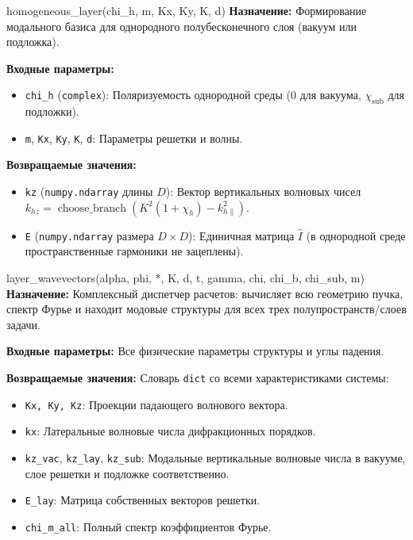 \documentclass[a4paper,11pt]{article}
\begin{document}
\begin{funcbox}{homogeneous\_layer(chi\_h, m, Kx, Ky, K, d)}
\textbf{Назначение:} Формирование модального базиса для однородного полубесконечного слоя (вакуум или подложка).

\textbf{Входные параметры:}
\begin{itemize}
    \item \texttt{chi\_h} (\texttt{complex}): Поляризуемость однородной среды ($0$ для вакуума, $\chi_{\text{sub}}$ для подложки).
    \item \texttt{m}, \texttt{Kx}, \texttt{Ky}, \texttt{K}, \texttt{d}: Параметры решетки и волны.
\end{itemize}

\textbf{Возвращаемые значения:}
\begin{itemize}
    \item \texttt{kz} (\texttt{numpy.ndarray} длины $D$): Вектор вертикальных волновых чисел $k_{hz} = \operatorname{choose\_branch}(K^2(1 + \chi_h) - k_{h\parallel}^2)$.
    \item \texttt{E} (\texttt{numpy.ndarray} размера $D \times D$): Единичная матрица $\hat{I}$ (в однородной среде пространственные гармоники не зацеплены).
\end{itemize}
\end{funcbox}

\begin{funcbox}{layer\_wavevectors(alpha, phi, *, K, d, t, gamma, chi, chi\_b, chi\_sub, m)}
\textbf{Назначение:} Комплексный диспетчер расчетов: вычисляет всю геометрию пучка, спектр Фурье и находит модовые структуры для всех трех полупространств/слоев задачи.

\textbf{Входные параметры:} Все физические параметры структуры и углы падения.

\textbf{Возвращаемые значения:} Словарь \texttt{dict} со всеми характеристиками системы:
\begin{itemize}
    \item \texttt{Kx, Ky, Kz}: Проекции падающего волнового вектора.
    \item \texttt{kx}: Латеральные волновые числа дифракционных порядков.
    \item \texttt{kz\_vac}, \texttt{kz\_lay}, \texttt{kz\_sub}: Модальные вертикальные волновые числа в вакууме, слое решетки и подложке соответственно.
    \item \texttt{E\_lay}: Матрица собственных векторов решетки.
    \item \texttt{chi\_m\_all}: Полный спектр коэффициентов Фурье.
\end{itemize}
\end{funcbox}
\end{document}
